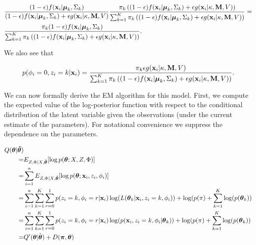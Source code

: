 \documentclass[12pt,english]{article}\usepackage[]{graphicx}\usepackage[]{color}
\begin{document}
\begin{equation}
\begin{split}
& \frac{(1-\epsilon)f({\bf x}_i|\boldsymbol{\mu}_k, \Sigma_{k})}{ (1-\epsilon) f({\bf x}_i|\boldsymbol{\mu}_k, \Sigma_k) + \epsilon g({\bf x}_i|\kappa, {\bf M}, V)}\frac{\pi_k \left((1-\epsilon)f({\bf x}_i|\boldsymbol{\mu}_k, \Sigma_{k}) + \epsilon g({\bf x}_i|\kappa, {\bf M}, V)\right)}{\sum_{k=1}^{K}\pi_k\left((1-\epsilon) f({\bf x}_i|\boldsymbol{\mu}_k, \Sigma_k) + \epsilon g({\bf x}_i|\kappa, {\bf M}, V)\right)} = \\
& \frac{\pi_k(1-\epsilon)f({\bf x}_i|\boldsymbol{\mu}_k, \Sigma_{k})}{\sum_{k=1}^{K}\pi_k\left((1-\epsilon) f({\bf x}_i|\boldsymbol{\mu}_k, \Sigma_k) + \epsilon g({\bf x}_i|\kappa, {\bf M}, V)\right)}.\\
\end{split}
\end{equation}

We also see that

\begin{equation}
p(\phi_i = 0, z_i = k| {\bf x}_i ) = \frac{\pi_k \epsilon g({\bf x}_i|\kappa, {\bf M}, V)}{\sum_{k=1}^{K}\pi_k\left((1-\epsilon) f({\bf x}_i|\boldsymbol{\mu}_k, \Sigma_k) + \epsilon g({\bf x}_i|\kappa, {\bf M}, V)\right)}.
\end{equation}

We can now formally derive the EM algorithm for this model. First, we
compute the expected value of the log-posterior function with respect
to the conditional distribution of the latent variable given the
observations (under the current estimate of the parameters). For
notational convenience we suppress the dependence on the parameters.

\begin{equation}
\begin{split}
Q(\boldsymbol{\theta}| \boldsymbol{\hat{\theta}}) & \\
= & E_{Z,\Phi|X, \hat{\boldsymbol{\theta}}}[\log p(\boldsymbol{\theta};X,Z,\Phi)] \\
= & \sum_{i=1}^{n} E_{Z,\Phi|X, \hat{\boldsymbol{\theta}}}[\log p(\boldsymbol{\theta}; {\bf x}_i,z_i,\phi_i)] \\
= & \sum_{i=1}^{n} \sum_{k=1}^{K}\sum_{r = 0}^{1}p(z_i = k, \phi_i = r|{\bf x}_i) \log(L(\boldsymbol{\theta}_k|{\bf x}_i, z_i = k, \phi_i))  + \log(p(\pi) + \sum_{k=1}^{K}\log(p(\boldsymbol{\theta}_k))\\
= & \sum_{i=1}^{n} \sum_{k=1}^{K}\sum_{r = 0}^{1}p(z_i = k, \phi_i = r|{\bf x}_i) \log(p({\bf x}_i, z_i = k , \phi_i|\boldsymbol{\theta}_k))  + \log(p(\pi) + \sum_{k=1}^{K}\log(p(\boldsymbol{\theta}_k))\\
= & Q'(\boldsymbol{\theta}| \hat{\boldsymbol{\theta}}) + D(\boldsymbol{\pi},\boldsymbol{\theta})
\end{split}
\end{equation}
\end{document}
